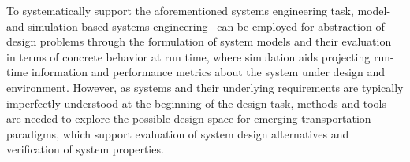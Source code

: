 \documentclass[a4paper,twoside]{article}
\begin{document}
	
	To systematically support the aforementioned systems engineering task, model- and simulation-based systems engineering~\cite{gianni2014modeling} can be employed for abstraction of design problems through the formulation of system models and their evaluation in terms of concrete behavior at run time, where simulation aids projecting run-time information and performance metrics about the system under design and environment. 
However, as systems and their underlying requirements are typically imperfectly understood at the beginning of the design task, methods and tools are needed to explore the possible design space for emerging transportation paradigms, which support evaluation of system design alternatives and verification of system properties. 
	
	
	
	
\end{document}

